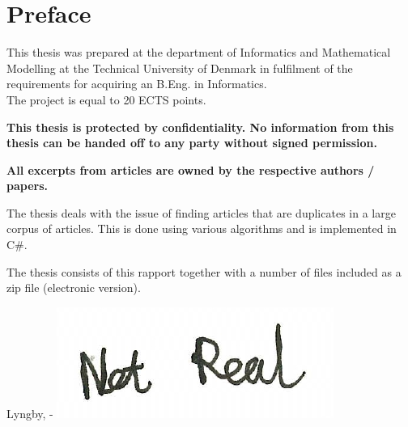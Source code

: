 \chapter{Preface}

This thesis was prepared at the department of Informatics and Mathematical Modelling at the Technical University of Denmark in fulfilment of the
requirements for acquiring an B.Eng. in Informatics. \\
The project is equal to 20 ECTS points.

\textbf{This thesis is protected by confidentiality. No information from this thesis can be handed off to any party without signed permission.}

\textbf{All excerpts from articles are owned by the respective authors / papers. }

The thesis deals with the issue of finding articles that are duplicates in a large corpus of articles. This is done using various algorithms and is implemented in C\#.

The thesis consists of this rapport together with a number of files included as a zip file (electronic version).
\vspace{20mm}
\begin{center}
    \hspace{20mm} Lyngby, \thesishandin-\thesisyear
    \vspace{5mm}
    \newline
    \includegraphics[scale=0.5]{figures/SignatureDummy}
\end{center}
\begin{flushright}
    \thesisauthor
\end{flushright}
